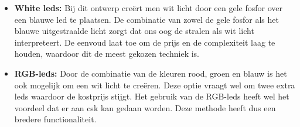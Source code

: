 \begin{itemize}
	\item \textbf{White \glspl{led}:} Bij dit ontwerp cre\"ert men wit licht door een gele fosfor over een blauwe \gls{led} te plaatsen. De combinatie van zowel de gele fosfor als het blauwe uitgestraalde licht zorgt dat ons oog de stralen als wit licht interpreteert. De eenvoud laat toe om de prijs en de complexiteit laag te houden, waardoor dit de meest gekozen techniek is.
	
	\item \textbf{RGB-\glspl{led}:} Door de combinatie van de kleuren rood, groen en blauw is het ook mogelijk om een wit licht te cre\"eren. Deze optie vraagt wel om twee extra \glspl{led} waardoor de kostprijs stijgt. Het gebruik van de RGB-\glspl{led} heeft wel het voordeel dat er aan \gls{csk} kan gedaan worden. Deze methode heeft dus een bredere functionaliteit.
\end{itemize}

